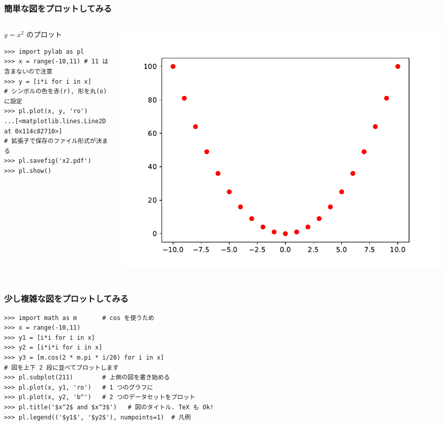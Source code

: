 \begin{frame}[t,fragile]
\frametitle{簡単な図をプロットしてみる}
\begin{columns}
\begin{column}{6cm}
$y = x^2$ のプロット
\begin{lstlisting}
>>> import pylab as pl
>>> x = range(-10,11) # 11 は含まないので注意
>>> y = [i*i for i in x]
# シンボルの色を赤(r), 形を丸(o)に設定
>>> pl.plot(x, y, 'ro')
...[<matplotlib.lines.Line2D at 0x114c82710>]
# 拡張子で保存のファイル形式が決まる
>>> pl.savefig('x2.pdf') 
>>> pl.show()
\end{lstlisting}
\end{column}

\begin{column}{6cm}
\includegraphics[width=\textwidth]{x2.pdf}
\end{column}
\end{columns}
\end{frame}

\subsection*{\redm\whitem\greenb}

\begin{frame}[t,fragile]
\frametitle{少し複雑な図をプロットしてみる}
\begin{lstlisting}
>>> import math as m       # cos を使うため
>>> x = range(-10,11)
>>> y1 = [i*i for i in x]
>>> y2 = [i*i*i for i in x]
>>> y3 = [m.cos(2 * m.pi * i/20) for i in x]
# 図を上下 2 段に並べてプロットします
>>> pl.subplot(211)        # 上側の図を書き始める
>>> pl.plot(x, y1, 'ro')   # 1 つのグラフに
>>> pl.plot(x, y2, 'b^')   # 2 つのデータセットをプロット
>>> pl.title('$x^2$ and $x^3$')   # 図のタイトル. TeX も Ok!
>>> pl.legend(('$y1$', '$y2$'), numpoints=1)  # 凡例
\end{lstlisting}
\end{frame}

